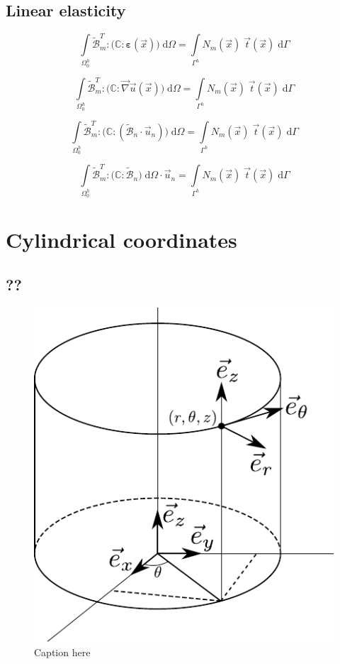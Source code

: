 \documentclass[times,namecite]{goose-article}
\begin{document}
\subsection{Linear elasticity}

\begin{equation}
  \int\limits_{\Omega_0^h}
    \tilde{\mathcal{B}}_m^T : \Big( \mathbb{C} : \bm{\varepsilon}(\vec{x}) \Big) \;
  \mathrm{d}\Omega
  =
  \int\limits_{\Gamma^h}
    N_m(\vec{x}) \; \vec{t}(\vec{x}) \;
  \mathrm{d}\Gamma
\end{equation}

\begin{equation}
  \int\limits_{\Omega_0^h}
    \tilde{\mathcal{B}}_m^T : \Big( \mathbb{C} : \vec{\nabla}\vec{u}(\vec{x}) \Big) \;
  \mathrm{d}\Omega
  =
  \int\limits_{\Gamma^h}
    N_m(\vec{x}) \; \vec{t}(\vec{x}) \;
  \mathrm{d}\Gamma
\end{equation}

\begin{equation}
  \int\limits_{\Omega_0^h}
    \tilde{\mathcal{B}}_m^T : \Big( \mathbb{C} : ( \tilde{\mathcal{B}}_n \cdot \vec{u}_n) \Big) \;
  \mathrm{d}\Omega
  =
  \int\limits_{\Gamma^h}
    N_m(\vec{x}) \; \vec{t}(\vec{x}) \;
  \mathrm{d}\Gamma
\end{equation}

\begin{equation}
  \int\limits_{\Omega_0^h}
    \tilde{\mathcal{B}}_m^T : \Big( \mathbb{C} : \tilde{\mathcal{B}}_n \Big) \;
  \mathrm{d}\Omega
  \cdot \vec{u}_n
  =
  \int\limits_{\Gamma^h}
    N_m(\vec{x}) \; \vec{t}(\vec{x}) \;
  \mathrm{d}\Gamma
\end{equation}

\section{Cylindrical coordinates}

\subsection{??}

\begin{figure}[htp]
  \centering
  \includegraphics[width=.2\textwidth]{figures/cylindrical_coordinates}
  \caption{Caption here}
  \label{fig:}
\end{figure}
\end{document}
